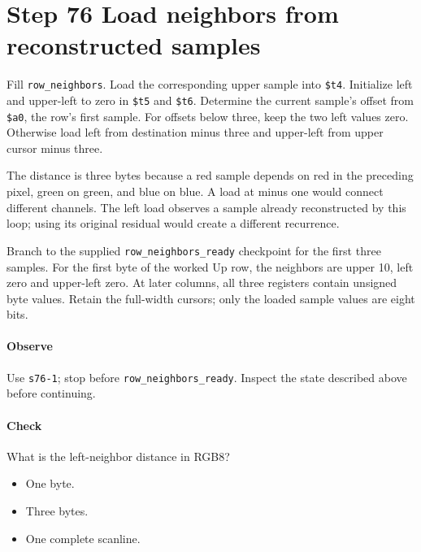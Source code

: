\section{Step 76 Load neighbors from reconstructed samples}
Fill \texttt{row\_neighbors}. Load the corresponding upper sample into \texttt{\$t4}. Initialize left and upper-left to zero in \texttt{\$t5} and \texttt{\$t6}. Determine the current sample’s offset from \texttt{\$a0}, the row’s first sample. For offsets below three, keep the two left values zero. Otherwise load left from destination minus three and upper-left from upper cursor minus three.

The distance is three bytes because a red sample depends on red in the preceding pixel, green on green, and blue on blue. A load at minus one would connect different channels. The left load observes a sample already reconstructed by this loop; using its original residual would create a different recurrence.

Branch to the supplied \texttt{row\_neighbors\_ready} checkpoint for the first three samples. For the first byte of the worked Up row, the neighbors are upper 10, left zero and upper-left zero. At later columns, all three registers contain unsigned byte values. Retain the full-width cursors; only the loaded sample values are eight bits.

\paragraph{Observe} Use \texttt{s76-1}; stop before \texttt{row\_neighbors\_ready}. Inspect the state described above before continuing.

\paragraph{Check} What is the left-neighbor distance in RGB8?
\begin{itemize}
\item[A.] One byte.
\item[B.] Three bytes.
\item[C.] One complete scanline.
\end{itemize}
